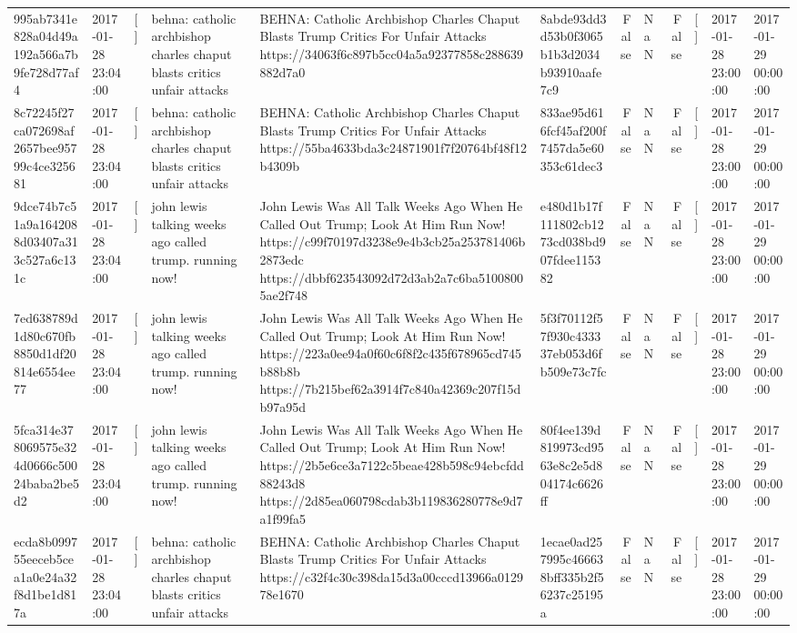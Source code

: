 \begin{tabular}{llllllrlrlll}
995ab7341e828a04d49a192a566a7b9fe728d77af4 & 2017-01-28 23:04:00 & [] & behna: catholic archbishop charles chaput blasts critics unfair attacks & BEHNA: Catholic Archbishop Charles Chaput Blasts Trump Critics For Unfair Attacks https://34063f6c897b5cc04a5a92377858c288639882d7a0 & 8abde93dd3d53b0f3065b1b3d2034b93910aafe7c9 & False & NaN & False & [] & 2017-01-28 23:00:00 & 2017-01-29 00:00:00 \\
8c72245f27ca072698af2657bee95799c4ce325681 & 2017-01-28 23:04:00 & [] & behna: catholic archbishop charles chaput blasts critics unfair attacks & BEHNA: Catholic Archbishop Charles Chaput Blasts Trump Critics For Unfair Attacks https://55ba4633bda3c24871901f7f20764bf48f12b4309b & 833ae95d616fcf45af200f7457da5e60353c61dec3 & False & NaN & False & [] & 2017-01-28 23:00:00 & 2017-01-29 00:00:00 \\
9dce74b7c51a9a1642088d03407a313c527a6c131c & 2017-01-28 23:04:00 & [] & john lewis talking weeks ago called trump. running now! & John Lewis Was All Talk Weeks Ago When He Called Out Trump; Look At Him Run Now! https://c99f70197d3238e9e4b3cb25a253781406b2873edc https://dbbf623543092d72d3ab2a7c6ba51008005ae2f748 & e480d1b17f111802cb1273cd038bd907fdee115382 & False & NaN & False & [] & 2017-01-28 23:00:00 & 2017-01-29 00:00:00 \\
7ed638789d1d80c670fb8850d1df20814e6554ee77 & 2017-01-28 23:04:00 & [] & john lewis talking weeks ago called trump. running now! & John Lewis Was All Talk Weeks Ago When He Called Out Trump; Look At Him Run Now! https://223a0ee94a0f60c6f8f2c435f678965cd745b88b8b https://7b215bef62a3914f7c840a42369c207f15db97a95d & 5f3f70112f57f930c433337eb053d6fb509e73c7fc & False & NaN & False & [] & 2017-01-28 23:00:00 & 2017-01-29 00:00:00 \\
5fca314e378069575e324d0666c50024baba2be5d2 & 2017-01-28 23:04:00 & [] & john lewis talking weeks ago called trump. running now! & John Lewis Was All Talk Weeks Ago When He Called Out Trump; Look At Him Run Now! https://2b5e6ce3a7122c5beae428b598c94ebcfdd88243d8 https://2d85ea060798cdab3b119836280778e9d7a1f99fa5 & 80f4ee139d819973cd9563e8c2e5d804174c6626ff & False & NaN & False & [] & 2017-01-28 23:00:00 & 2017-01-29 00:00:00 \\
ecda8b099755eeceb5cea1a0e24a32f8d1be1d817a & 2017-01-28 23:04:00 & [] & behna: catholic archbishop charles chaput blasts critics unfair attacks & BEHNA: Catholic Archbishop Charles Chaput Blasts Trump Critics For Unfair Attacks https://c32f4c30c398da15d3a00cccd13966a012978e1670 & 1ecae0ad257995c466638bff335b2f56237c25195a & False & NaN & False & [] & 2017-01-28 23:00:00 & 2017-01-29 00:00:00 \\

\end{tabular}
